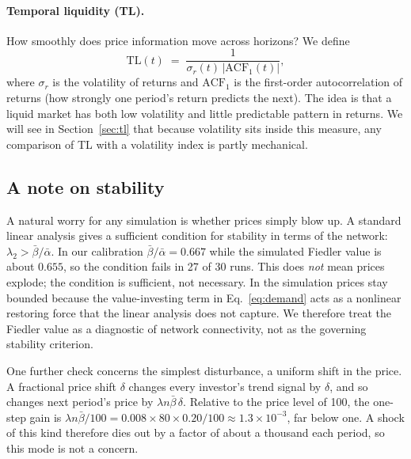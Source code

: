 \paragraph{Temporal liquidity (TL).} How smoothly does price information move across horizons? We define
\begin{equation}
\mathrm{TL}(t)\;=\;\frac{1}{\sigma_r(t)\,|\mathrm{ACF}_1(t)|},
\label{eq:tl}
\end{equation}
where $\sigma_r$ is the volatility of returns and $\mathrm{ACF}_1$ is the first-order autocorrelation of returns (how strongly one period's return predicts the next). The idea is that a liquid market has both low volatility and little predictable pattern in returns. We will see in Section~\ref{sec:tl} that because volatility sits inside this measure, any comparison of TL with a volatility index is partly mechanical.

\subsection{A note on stability}

A natural worry for any simulation is whether prices simply blow up. A standard linear analysis gives a sufficient condition for stability in terms of the network: $\lambda_2>\bar\beta/\bar\alpha$. In our calibration $\bar\beta/\bar\alpha = 0.667$ while the simulated Fiedler value is about $0.655$, so the condition fails in 27 of 30 runs. This does \emph{not} mean prices explode; the condition is sufficient, not necessary. In the simulation prices stay bounded because the value-investing term in Eq.~\eqref{eq:demand} acts as a nonlinear restoring force that the linear analysis does not capture. We therefore treat the Fiedler value as a diagnostic of network connectivity, not as the governing stability criterion.

One further check concerns the simplest disturbance, a uniform shift in the price. A fractional price shift $\delta$ changes every investor's trend signal by $\delta$, and so changes next period's price by $\lambda n\bar\beta\,\delta$. Relative to the price level of 100, the one-step gain is $\lambda n \bar\beta/100 = 0.008\times 80\times 0.20/100\approx 1.3\times 10^{-3}$, far below one. A shock of this kind therefore dies out by a factor of about a thousand each period, so this mode is not a concern.
